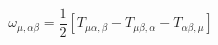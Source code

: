 \begin{equation}
\omega_{\mu,\alpha\beta} = \frac{1}{2} [ T_{\mu\alpha,\beta} -
T_{\mu\beta,\alpha} - T_{\alpha\beta,\mu} ]
\end{equation}

